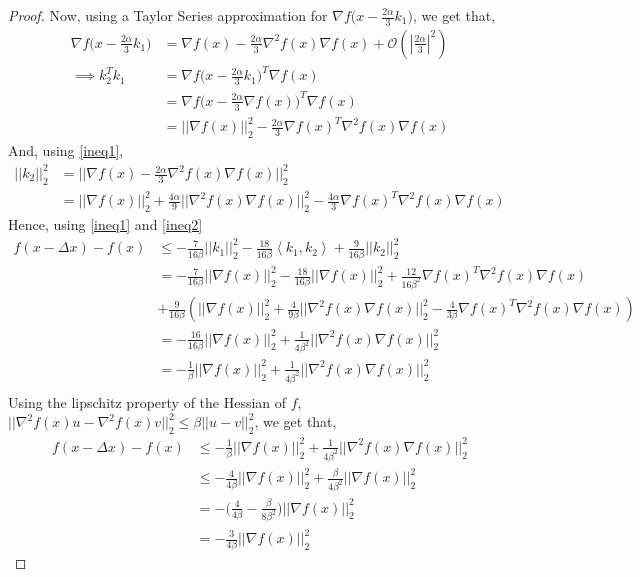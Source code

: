 \begin{proof}
Now, using a Taylor Series approximation for $\nabla f \big( x -  \frac{2\alpha}{3}k_1 \big)$, we get that,
\begin{equation}
\begin{aligned}\label{ineq1}
\nabla f \big( x - \frac{2\alpha}{3}k_1 \big) &= \nabla f(x) - \frac{2\alpha}{3} \nabla^2 f(x) \nabla f(x) + \mathcal{O}( |\frac{2\alpha}{3} |^2 ) \\
\implies  k_2^Tk_1 &= \nabla f \big( x - \frac{2\alpha}{3}k_1 \big)^T\nabla f(x) \\
 &= \nabla f \big( x - \frac{2\alpha}{3}\nabla f(x) \big)^T \nabla f(x) \\
&= || \nabla f(x) ||_2^2 - \frac{2\alpha}{3} \nabla f(x)^T \nabla^2 f(x) \nabla f(x)
\end{aligned}
\end{equation}
And, using \eqref{ineq1},
\begin{equation}
\begin{aligned} \label{ineq2}
|| k_2 ||_2^2 &= ||  \nabla f(x) - \frac{2\alpha}{3} \nabla^2 f(x) \nabla f(x)  ||_2^2   \\
&= || \nabla f(x)||_2^2 + \frac{4\alpha}{9}||\nabla^2 f(x) \nabla f(x)  ||_2^2 - \frac{4\alpha}{3} \nabla f(x)^T \nabla^2 f(x) \nabla f(x)
\end{aligned}
\end{equation}
Hence, using \eqref{ineq1} and \eqref{ineq2}
\begin{align*}
f(x - \Delta x) - f(x) & \leq  -\frac{7}{16 \beta}|| k_1 ||_2^2 - \frac{18}{16 \beta} \left\langle k_1, k_2 \right\rangle + \frac{9}{16 \beta}|| k_2 ||_2^2 \\
&= -\frac{7}{16 \beta}|| \nabla f(x) ||_2^2 -  \frac{18}{16 \beta} || \nabla f(x) ||_2^2 + \frac{12}{16 \beta^2} \nabla f(x)^T \nabla^2 f(x) \nabla f(x) \\
&+  \frac{9}{16\beta}( || \nabla f(x)||_2^2 + \frac{4}{9\beta}||\nabla^2 f(x) \nabla f(x)  ||_2^2 - \frac{4}{3\beta} \nabla f(x)^T \nabla^2 f(x) \nabla f(x) )  \\
&= -\frac{16}{16 \beta}|| \nabla f(x)||_2^2 + \frac{1}{4 \beta^2}||\nabla^2 f(x) \nabla f(x)  ||_2^2 \\
&= -\frac{1}{\beta} || \nabla f(x)||_2^2 + \frac{1}{4 \beta^2}||\nabla^2 f(x) \nabla f(x)  ||_2^2 \\
\end{align*}
Using the lipschitz property of the Hessian of $f$, $||\nabla^2 f(x) u - \nabla^2 f(x) v||_2^2 \leq \beta || u-v ||_2^2 $, we get that,
\begin{equation}
\begin{aligned}
f(x - \Delta x) - f(x) & \leq -\frac{1}{\beta} || \nabla f(x)||_2^2 + \frac{1}{4\beta^2}||\nabla^2 f(x) \nabla f(x)  ||_2^2 \\
& \leq -\frac{4}{4\beta}|| \nabla f(x) ||_2^2 + \frac{\beta}{4 \beta^2}|| \nabla f(x) ||_2^2 \\
& = -\big( \frac{4}{4\beta} - \frac{\beta}{8\beta^2}   \big)  || \nabla f(x) ||_2^2  \\
&= -\frac{3}{4\beta} || \nabla f(x) ||_2^2
\end{aligned}
\end{equation}
\end{proof}
